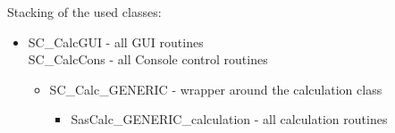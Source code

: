 \documentclass[11pt]{article} %
\begin{document}
Stacking of the used classes:
\begin{itemize}
\item[] SC\_CalcGUI - all GUI routines \\
	  SC\_CalcCons - all Console control routines
	\begin{itemize}
	\item[] SC\_Calc\_GENERIC - wrapper around the calculation class
		\begin{itemize}
		\item[] SasCalc\_GENERIC\_calculation - all calculation routines
		\end{itemize}
	\end{itemize}
\end{itemize}


%
%
\end{document}
